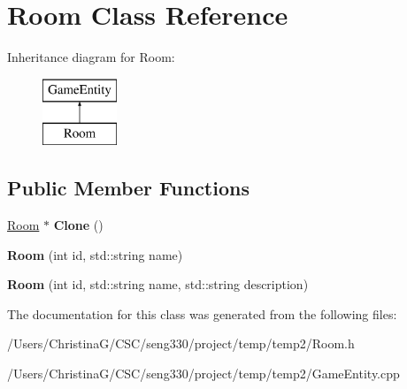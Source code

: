 \hypertarget{class_room}{}\section{Room Class Reference}
\label{class_room}
Inheritance diagram for Room\+:\begin{figure}[H]
\begin{center}
\leavevmode
\includegraphics[height=2.000000cm]{class_room}
\end{center}
\end{figure}
\subsection*{Public Member Functions}
\begin{DoxyCompactItemize}
\item 
\hypertarget{class_room_a15e3463eb05ec8de060d67fb11f6688d}{}\hyperlink{class_room}{Room} $\ast$ {\bfseries Clone} ()\label{class_room_a15e3463eb05ec8de060d67fb11f6688d}

\item 
\hypertarget{class_room_a18d9c7ed056c4bec868cf6939dc90aac}{}{\bfseries Room} (int id, std\+::string name)\label{class_room_a18d9c7ed056c4bec868cf6939dc90aac}

\item 
\hypertarget{class_room_a2286569deae9af3cafc5716ce72dcbf1}{}{\bfseries Room} (int id, std\+::string name, std\+::string description)\label{class_room_a2286569deae9af3cafc5716ce72dcbf1}

\end{DoxyCompactItemize}


The documentation for this class was generated from the following files\+:\begin{DoxyCompactItemize}
\item 
/\+Users/\+Christina\+G/\+C\+S\+C/seng330/project/temp/temp2/Room.\+h\item 
/\+Users/\+Christina\+G/\+C\+S\+C/seng330/project/temp/temp2/Game\+Entity.\+cpp\end{DoxyCompactItemize}
